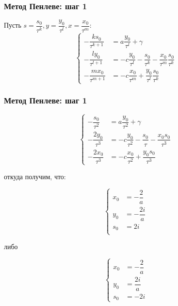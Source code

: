 \documentclass[14pt]{beamer}
\begin{document}
\begin{frame}

\frametitle{Метод Пенлеве: шаг 1}

\small{Пусть $ s = \dfrac{s_0}{\tau^k}, y = \dfrac{y_0}{\tau^l} , x = \dfrac{x_0}{\tau^m} $:}
\vspace{10pt}
$$      
         \left\{
                \begin{aligned}
                        -\dfrac{ks_0}{\tau^{k+1}} &= a \dfrac{y_0}{\tau^l} + \gamma \\
                        -\dfrac{ly_0}{\tau^{l+1}} &= -c \dfrac{y_0}{\tau^l} - \dfrac{s_0}{\tau^k} - \dfrac{x_0}{\tau^m} \dfrac{s_0}{\tau^k} \\
                        -\dfrac{mx_0}{\tau^{m+1}} &= -c \dfrac{x_0}{\tau^m} + \dfrac{y_0}{\tau^l} \dfrac{s_0}{\tau^k}
                \end{aligned}
        \right.
$$

\end{frame}



\begin{frame}

\frametitle{Метод Пенлеве: шаг 1}

\small{
$$
        \left\{
                \begin{aligned}
                        -\dfrac{s_0}{\tau^2} &= a \dfrac{y_0}{\tau^2} + \gamma \\
                        -\dfrac{2y_0}{\tau^3} &= -c \dfrac{y_0}{\tau^2} - \dfrac{s_0}{\tau} - \dfrac{x_0 s_0}{\tau^3} \\
                        -\dfrac{2x_0}{\tau^{3}} &= -c \dfrac{x_0}{\tau^2} + \dfrac{y_0 s_0}{\tau^3}
                \end{aligned}
        \right.
$$
}

откуда получим, что:

\vspace{10pt}

\begin{minipage}[h!]{0.4\linewidth}
$$
\label{eq:step2_a}
\left\{
\begin{aligned}
  x_0 &= - \dfrac{2}{a} \\
  y_0 &= -\dfrac{2i}{a} \\
  s_0 &= 2i \\
\end{aligned}
\right.
$$
\end{minipage}
\hfill
либо
\hfill
\begin{minipage}[h!]{0.4\linewidth}
$$
\label{eq:step2_b}
\left\{
\begin{aligned}
  x_0 &= - \dfrac{2}{a} \\
  y_0 &= \dfrac{2i}{a} \\
  s_0 &= - 2i
\end{aligned}
\right.
$$
\end{minipage}


\end{frame}
\end{document}
